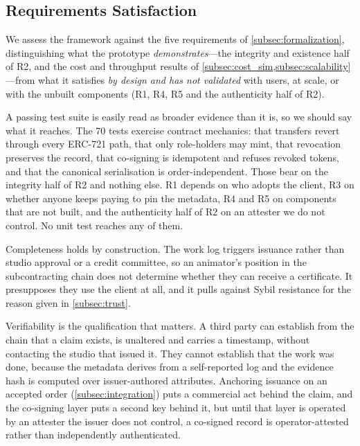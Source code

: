 \subsection{Requirements Satisfaction}
\label{subsec:requirements_eval}

We assess the framework against the five requirements of \cref{subsec:formalization},
distinguishing what the prototype \emph{demonstrates}---the integrity and existence half
of R2, and the cost and throughput results of
\cref{subsec:cost_sim,subsec:scalability}---from what it satisfies \emph{by design and
has not validated} with users, at scale, or with the unbuilt components (R1, R4, R5 and
the authenticity half of R2).

A passing test suite is easily read as broader evidence than it is, so we should say what
it reaches. The 70 tests exercise contract mechanics: that transfers revert through every
ERC-721 path, that only role-holders may mint, that revocation preserves the record, that
co-signing is idempotent and refuses revoked tokens, and that the canonical serialisation
is order-independent. Those bear on the integrity half of R2 and nothing else. R1 depends
on who adopts the client, R3 on whether anyone keeps paying to pin the metadata, R4 and R5
on components that are not built, and the authenticity half of R2 on an attester we do not
control. No unit test reaches any of them.

Completeness holds by construction. The work log triggers issuance rather than studio
approval or a credit committee, so an animator's position in the subcontracting chain does
not determine whether they can receive a certificate. It presupposes they use the client
at all, and it pulls against Sybil resistance for the reason given in
\cref{subsec:trust}.

Verifiability is the qualification that matters. A third party can establish from
the chain that a claim exists, is unaltered and carries a timestamp, without
contacting the studio that issued it. They cannot establish that the work was
done, because the metadata derives from a self-reported log and the evidence hash
is computed over issuer-authored attributes. Anchoring issuance on an accepted
order (\cref{subsec:integration}) puts a commercial act behind the claim, and the
co-signing layer puts a second key behind it, but until that layer is operated by
an attester the issuer does not control, a co-signed record is operator-attested
rather than independently authenticated.

